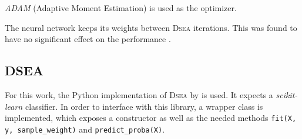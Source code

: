 
\emph{ADAM} (Adaptive Moment Estimation) \cite{adam} is used as the optimizer.

The neural network keeps its weights between \textsc{Dsea} iterations.
This was found to have no significant effect on the performance \cite{dsea_samuel}. %


\subsection{DSEA}
For this work, the Python implementation of \textsc{Dsea} \cite{dsea_code} by \citeauthor{dsea_mirko} is used.
It expects a \emph{scikit-learn} classifier.
In order to interface with this library,
a wrapper class is implemented,
  which exposes a constructor as well as the needed methods
  \texttt{fit(X, y, sample_weight)} and
  \texttt{predict_proba(X)}.
